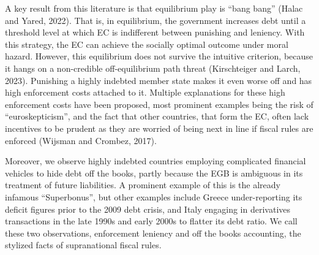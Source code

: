\documentclass{article}
\begin{document}
A key result from this literature is that equilibrium play is “bang bang” (Halac and Yared, 2022). That is, in equilibrium, the government increases debt until a threshold level at which EC is indifferent between punishing and leniency. With this strategy, the EC can achieve the socially optimal outcome under moral hazard. However, this equilibrium does not survive the intuitive criterion, because it hangs on a non-credible off-equilibrium path threat (Kirschteiger and Larch, 2023). Punishing a highly indebted member state makes it even worse off and has high enforcement costs attached to it. Multiple explanations for these high enforcement costs have been proposed, most prominent examples being the risk of “euroskepticism”, and the fact that other countries, that form the EC, often lack incentives to be prudent as they are worried of being next in line if fiscal rules are enforced (Wijsman and Crombez, 2017). 

Moreover, we observe highly indebted countries employing complicated financial vehicles to hide debt off the books, partly because the EGB is ambiguous in its treatment of future liabilities. A prominent example of this is the already infamous “Superbonus”, but other examples include Greece under-reporting its deficit figures prior to the 2009 debt crisis, and Italy engaging in derivatives transactions in the late 1990s and early 2000s to flatter its debt ratio. We call these two observations, enforcement leniency and off the books accounting, the stylized facts of supranational fiscal rules.
\end{document}
